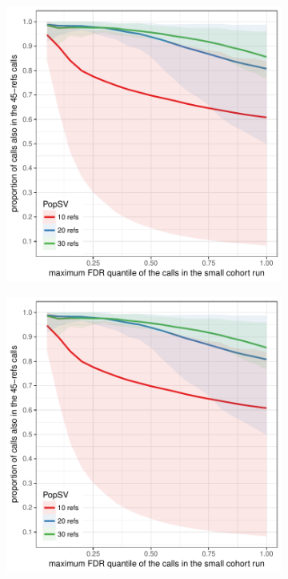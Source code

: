 \begin{figure}[htp]
  \centering
  \begin{subfigure}[b]{.49\textwidth}
    \includegraphics[width=\linewidth, page=1]{figures/PopSV-cohortSize.pdf}
    \caption{}
  \end{subfigure}
  \begin{subfigure}[b]{.49\textwidth}
    \includegraphics[width=\linewidth, page=3]{figures/PopSV-cohortSize.pdf}

\end{subfigure}
\end{figure}
